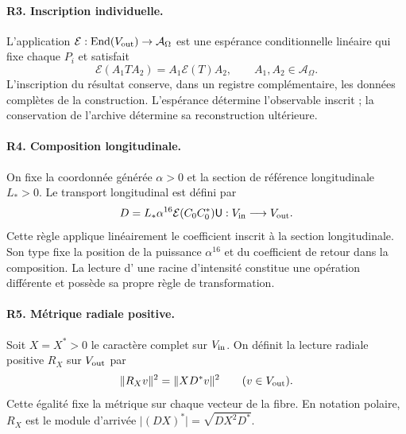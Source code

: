 \paragraph{R3. Inscription individuelle.}
L'application \(\mathcal E:\operatorname{End}(V_{\rm out})\to\mathcal A_\Omega\) est une espérance conditionnelle linéaire qui fixe chaque \(P_i\) et satisfait
\begin{equation}
 \mathcal E(A_1TA_2)=A_1\mathcal E(T)A_2,
 \qquad A_1,A_2\in\mathcal A_\Omega.
 \label{g26:eq:bimodularidad-es}
\end{equation}
L'inscription du résultat conserve, dans un registre complémentaire,
les données complètes de la construction. L'espérance détermine
l'observable inscrit ; la conservation de l'archive détermine sa
reconstruction ultérieure.

\paragraph{R4. Composition longitudinale.}
On fixe la coordonnée générée \(\alpha>0\) et la section de référence longitudinale \(L_*>0\). Le transport longitudinal est défini par
\begin{equation}
 D=L_*\alpha^{16}\mathcal E(C_0C_0^*)\mathsf U:
 V_{\rm in}\longrightarrow V_{\rm out}.
 \label{g26:eq:regla-longitudinal-es}
\end{equation}
Cette règle applique linéairement le coefficient inscrit à la section
longitudinale. Son type fixe la position de la puissance \(\alpha^{16}\)
et du coefficient de retour dans la composition. La lecture d'
une racine d'intensité constitue une opération différente et possède sa
propre règle de transformation.

\paragraph{R5. Métrique radiale positive.}
Soit \(X=X^*>0\) le caractère complet sur \(V_{\rm in}\). On définit
la lecture radiale positive \(R_X\) sur \(V_{\rm out}\) par
\begin{equation}
 \|R_Xv\|^2=\|XD^*v\|^2
 \qquad(v\in V_{\rm out}).
 \label{g26:eq:metrica-radial-es}
\end{equation}
Cette égalité fixe la métrique sur chaque vecteur de la fibre. En notation polaire, \(R_X\) est le module d'arrivée \(\lvert(DX)^*\rvert=\sqrt{DX^2D^*}\).

